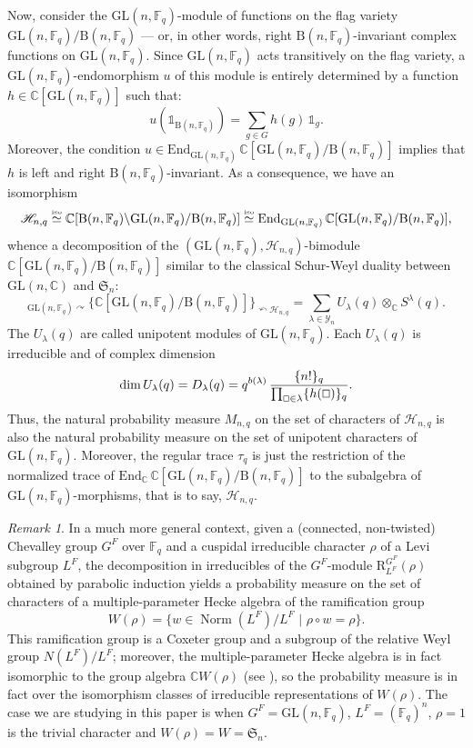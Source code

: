 \documentclass[10pt]{amsart}
\theoremstyle{remark}
\newtheorem{remark}{Remark}
\newcommand{\C}{\mathbb{C}}
\newcommand{\IH}{\mathscr{H}}
\newcommand{\hendo}{\mathrm{End}}
\newcommand{\sym}{\mathfrak{S}}
\newcommand{\young}{\mathscr{Y}}
\newcommand{\GL}{\mathrm{GL}}
\newcommand{\GB}{\mathrm{B}}
\newcommand{\For}{\mathbb{F}}
\newcommand{\iso}{\stackrel{\text{\tiny iso}}{\simeq}}
\DeclareMathOperator{\Norm}{Norm}
\begin{document}
Now, consider the $\GL(n,\For_q)$-module of functions on the flag variety $\GL(n,\For_q)/ \GB(n,\For_q)$ --- or, in other words, right $\GB(n,\For_q)$-invariant complex functions on $\GL(n,\For_q)$. Since $\GL(n,\For_q)$ acts transitively on the flag variety, a $\GL(n,\For_q)$-endomorphism $u$ of this module is entirely determined by a function $h \in \C[\GL(n,\For_q)]$ such that:
$$u(\mathbb{1}_{\GB(n,\For_q)})=\sum_{g \in G} h(g)\,\mathbb{1}_g.$$
Moreover, the condition $u \in \hendo_{\GL(n,\For_q)}\, \C[\GL(n,\For_q)/\GB(n,\For_q)]$ implies that $h$ is left and right $\GB(n,\For_q)$-invariant. As a consequence, we have an isomorphism
$$\IH_{n,q} \iso \C[\GB(n,\For_q)\backslash \GL(n,\For_q) / \GB(n,\For_q)] \iso \hendo_{\GL(n,\For_q)}\,\C[\GL(n,\For_q)/\GB(n,\For_q)],$$
whence a decomposition of the $(\GL(n,\For_q),\IH_{n,q})$-bimodule $\C[\GL(n,\For_q)/\GB(n,\For_q)]$ similar to the classical Schur-Weyl duality between $\GL(n,\C)$ and $\sym_n$:
$$_{\GL(n,\For_q) \curvearrowright }\big\{\C[\GL(n,\For_q)/\GB(n,\For_q)]\big\}_{\curvearrowleft \IH_{n,q}} =\sum_{\lambda \in \young_n} U_\lambda(q) \otimes_{\C} S^\lambda(q).$$
The $U_\lambda(q)$ are called unipotent modules of $\GL(n,\For_q)$. Each $U_\lambda(q)$ is irreducible and of complex dimension
$$\dim U_\lambda(q) = D_\lambda(q) =q^{b(\lambda)} \, \frac{\{n!\}_q}{\prod_{\oblong \in \lambda} \{h(\oblong)\}_q}.$$
Thus, the natural probability measure $M_{n,q}$ on the set of characters of $\IH_{n,q}$ is also the natural probability measure on the set of unipotent characters of $\GL(n,\For_q)$. Moreover, the regular trace $\tau_{q}$ is just the restriction of the normalized trace of $\hendo_{\C}\, \C[\GL(n,\For_{q})/\GB(n,\For_{q})]$ to the subalgebra of $\GL(n,\For_{q})$-morphisms, that is to say, $\IH_{n,q}$.\bigskip

\begin{remark}
In a much more general context, given a (connected, non-twisted) Chevalley group $G^{F}$ over $\For_{q}$ and a cuspidal irreducible character $\rho$ of a Levi subgroup $L^{F}$, the decomposition in irreducibles of the $G^{F}$-module $\mathrm{R}_{L^{F}}^{G^{F}}(\rho)$ obtained by parabolic induction yields a probability measure on the set of characters of a multiple-parameter Hecke algebra of the ramification group
$$W(\rho)=\{w \in \Norm(L^{F})/L^{F}\,\,|\,\,\rho \circ w = \rho\}.$$
This ramification group is a Coxeter group and a subgroup of the relative Weyl group $N(L^{F})/L^{F}$; moreover, the multiple-parameter Hecke algebra is in fact isomorphic to the group algebra $\C W(\rho)$ (see \cite{HL80,Lus84,Geck93}), so the probability measure is in fact over the isomorphism classes of irreducible representations of $W(\rho)$. The case we are studying in this paper is when $G^{F}=\GL(n,\For_{q})$, $L^{F}=(\For_{q})^{n}$, $\rho=1$ is the trivial character and $W(\rho)=W=\sym_{n}$.
\end{remark}
\bigskip
\end{document}
